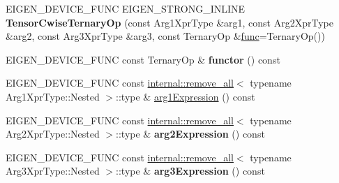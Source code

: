 \begin{DoxyCompactItemize}
E\+I\+G\+E\+N\+\_\+\+D\+E\+V\+I\+C\+E\+\_\+\+F\+U\+NC E\+I\+G\+E\+N\+\_\+\+S\+T\+R\+O\+N\+G\+\_\+\+I\+N\+L\+I\+NE {\bfseries Tensor\+Cwise\+Ternary\+Op} (const Arg1\+Xpr\+Type \&arg1, const Arg2\+Xpr\+Type \&arg2, const Arg3\+Xpr\+Type \&arg3, const Ternary\+Op \&\hyperlink{structfunc}{func}=Ternary\+Op())
\item 
\mbox{\label{class_eigen_1_1_tensor_cwise_ternary_op_a92b579cf1d2f0e50da90d74da3ca171a}} 
E\+I\+G\+E\+N\+\_\+\+D\+E\+V\+I\+C\+E\+\_\+\+F\+U\+NC const Ternary\+Op \& {\bfseries functor} () const
\item 
E\+I\+G\+E\+N\+\_\+\+D\+E\+V\+I\+C\+E\+\_\+\+F\+U\+NC const \hyperlink{struct_eigen_1_1internal_1_1remove__all}{internal\+::remove\+\_\+all}$<$ typename Arg1\+Xpr\+Type\+::\+Nested $>$\+::type \& \hyperlink{class_eigen_1_1_tensor_cwise_ternary_op_a6e797469eff84e6b24dab5bf5f2c1da8}{arg1\+Expression} () const
\item 
\mbox{\label{class_eigen_1_1_tensor_cwise_ternary_op_a0126952332ec91c521b1302430c8c078}} 
E\+I\+G\+E\+N\+\_\+\+D\+E\+V\+I\+C\+E\+\_\+\+F\+U\+NC const \hyperlink{struct_eigen_1_1internal_1_1remove__all}{internal\+::remove\+\_\+all}$<$ typename Arg2\+Xpr\+Type\+::\+Nested $>$\+::type \& {\bfseries arg2\+Expression} () const
\item 
\mbox{\label{class_eigen_1_1_tensor_cwise_ternary_op_af61803afff8cef7bfac41435e6f90913}} 
E\+I\+G\+E\+N\+\_\+\+D\+E\+V\+I\+C\+E\+\_\+\+F\+U\+NC const \hyperlink{struct_eigen_1_1internal_1_1remove__all}{internal\+::remove\+\_\+all}$<$ typename Arg3\+Xpr\+Type\+::\+Nested $>$\+::type \& {\bfseries arg3\+Expression} () const
\end{DoxyCompactItemize}
